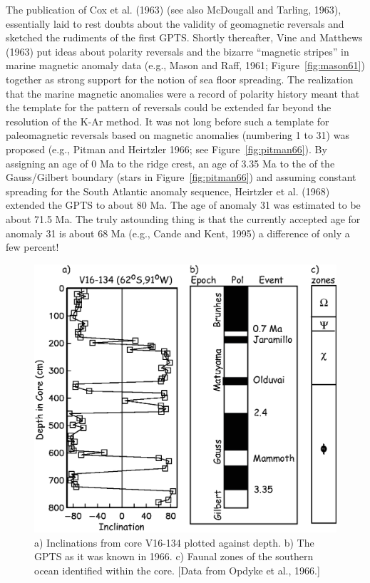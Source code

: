 The publication of 
Cox et al. (1963) (see also 
McDougall and Tarling, 1963), \nocite{mcdougall63}  essentially laid to rest doubts about the validity of geomagnetic reversals and sketched the rudiments of the first GPTS.  Shortly thereafter,  
Vine and Matthews (1963) \nocite{vine63} put ideas about polarity reversals and the bizarre ``magnetic stripes'' in marine magnetic anomaly data (e.g., 
Mason and Raff, 1961; Figure~\ref{fig:mason61}) together \nocite{mason61}  as strong support for the notion of sea floor spreading.   The realization that the marine magnetic anomalies were a record of polarity history meant that  the template for the pattern of reversals could be extended far beyond the resolution of the K-Ar method.     It was not long before such a template for paleomagnetic reversals based on magnetic anomalies (numbering  1 to 31) was proposed (e.g.,
Pitman and Heirtzler 1966; see Figure~\ref{fig:pitman66}).  \nocite{pitman66} By assigning an age of 0 Ma to the ridge crest, an age of 3.35 Ma to the of the Gauss/Gilbert boundary (stars in  Figure~\ref{fig:pitman66}) and assuming constant spreading for the South Atlantic anomaly sequence, 
Heirtzler et al. (1968) \nocite{heirtzler68} extended the GPTS to about 80 Ma. The age of anomaly 31 was estimated to be about 71.5 Ma.  The truly astounding thing is that the currently accepted age for anomaly 31 is about 68 Ma (e.g.,
 Cande and Kent, 1995) \nocite{cande95} a difference of only a few percent!      


\begin{figure}[h!tb]
\centering  \includegraphics[width=10.5 cm]{EPSfiles/opdyke66.eps}
\caption{a) Inclinations from core V16-134 plotted against depth.  b) The GPTS as it was known in 1966.  c) Faunal zones of the southern ocean identified within the core.    [Data from  Opdyke et al., 1966.]}
\label{fig:opdyke66}
\end{figure}


